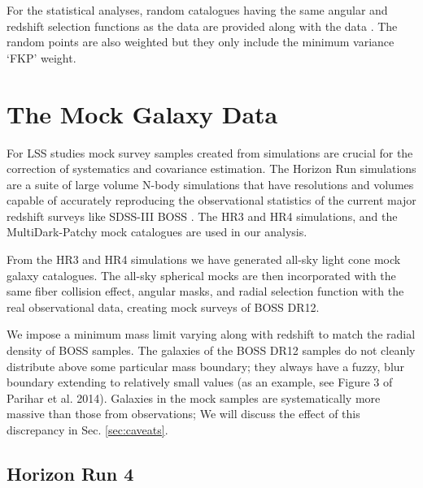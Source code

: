 \documentclass[iop]{emulateapj}
\begin{document}
For the statistical analyses, 
random catalogues having the same angular and redshift selection functions as the data 
are provided along with the data \citep{Reidetal:2016}.
The random points are also weighted but they only include the minimum variance `FKP' weight. 




\section{The Mock Galaxy Data}
\label{sec:mocks}


For LSS studies mock survey samples created from simulations are crucial
for the correction of systematics and covariance estimation.
The Horizon Run simulations are a suite of large volume N-body simulations that 
have resolutions and volumes capable of accurately reproducing the observational statistics of the current major redshift surveys like 
SDSS-III BOSS \citep{park 2005,2009ApJ...701.1547K,horizonrun}.
The HR3 \citep{horizonrun} and HR4 \citep{hr4} simulations, and the MultiDark-Patchy mock catalogues \citep{MDPATCHY} are used in our analysis.

From the HR3 and HR4 simulations we have generated all-sky light cone mock galaxy catalogues.
The all-sky spherical mocks are then incorporated with the same fiber collision effect, 
angular masks, and radial selection function with the real observational data,
creating mock surveys of BOSS DR12.

We impose a minimum mass limit varying along with redshift to match the radial density of BOSS samples.
The galaxies of the BOSS DR12 samples do not cleanly distribute above some particular mass boundary;
they always have a fuzzy, blur boundary extending to relatively small values (as an example, see Figure 3 of 
Parihar et al. 2014). %
Galaxies in the mock samples are systematically more massive than those from observations;
We will discuss the effect of this discrepancy in Sec. \ref{sec:caveats}.

\subsection{Horizon Run 4}
\end{document}
